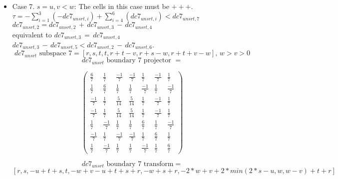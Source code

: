 \documentclass[preprint]{iucr}              %
\begin{document}
{\begin{itemize}
     \item{Case 7. $s=u, v < w$:  The cells in this case must be $+++$.\\
     $\tau=-\sum_{i=1}^3(-dc7_{unsrt,i})+\sum_{i=4}^6(dc7_{unsrt,i}) < dc7_{unsrt,7}$\\
     $dc7_{unsrt,2}=dc7_{unsrt,2}\,+\,dc7_{unsrt,3}\,-\,dc7_{unsrt,4}$\\
          equivalent to
     $dc7_{unsrt,3}\,=\,dc7_{unsrt,4}$\\
     $dc7_{unsrt,3}\,-\,dc7_{unsrt,5} <
     dc7_{unsrt,2}\,-\,dc7_{unsrt,6}$.
     \[dc7_{unsrt} \text{ subspace 7}=[r,s,t,t,r+t-v,r+s-w, r+t+v-w],\, w > v > 0 \]
     \[dc7_{unsrt} \text{ boundary 7 projector } =\]
\begin{center}
\begin{equation*}
\begin{pmatrix}
\frac{6}{7}&\frac{1}{7}&\frac{-1}{7}&\frac{-1}{7}&\frac{1}{7}&\frac{-1}{7}&\frac{1}{7}\\[.25em]
\frac{1}{7}&\frac{6}{7}&\frac{1}{7}&\frac{1}{7}&\frac{-1}{7}&\frac{1}{7}&\frac{-1}{7}\\[.25em]
\frac{-1}{7}&\frac{1}{7}&\frac{5}{14}&\frac{5}{14}&\frac{1}{7}&\frac{-1}{7}&\frac{1}{7}\\[.25em]
\frac{-1}{7}&\frac{1}{7}&\frac{5}{14}&\frac{5}{14}&\frac{1}{7}&\frac{-1}{7}&\frac{1}{7}\\[.25em]
\frac{1}{7}&\frac{-1}{7}&\frac{1}{7}&\frac{1}{7}&\frac{6}{7}&\frac{1}{7}&\frac{-1}{7}\\[.25em]
\frac{-1}{7}&\frac{1}{7}&\frac{-1}{7}&\frac{-1}{7}&\frac{1}{7}&\frac{6}{7}&\frac{1}{7}\\[.25em]
\frac{1}{7}&\frac{-1}{7}&\frac{1}{7}&\frac{1}{7}&\frac{-1}{7}&\frac{1}{7}&\frac{6}{7}
\end{pmatrix}
\end{equation*}
\end{center}


 \[dc7_{unsrt} \text{ boundary 7 transform}=\]
 \[ [r,s,-u+t+s,t,-w+v-u+t+s+r,-w+s+r,-2*w+v+2*min(2*s-u,w,w-v)+t+r] \]
  }
     

\end{itemize}}
\end{document}
